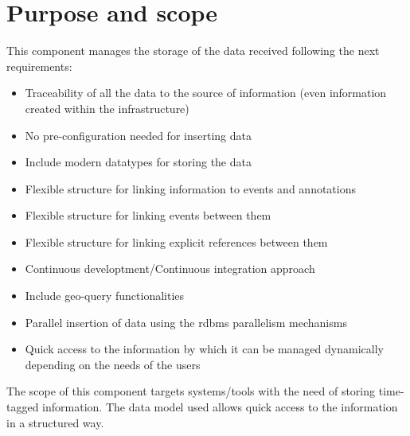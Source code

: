 \chapter{Purpose and scope}

This component manages the storage of the data received following the next requirements:

\begin{itemize} 

\item Traceability of all the data to the source of information (even information created within the infrastructure)

\item No pre-configuration needed for inserting data

\item Include modern datatypes for storing the data

\item Flexible structure for linking information to events and annotations

\item Flexible structure for linking events between them

\item Flexible structure for linking explicit references between them

\item Continuous developtment/Continuous integration approach

\item Include geo-query functionalities

\item Parallel insertion of data using the \acrshort{rdbms} parallelism mechanisms

\item Quick access to the information by which it can be managed dynamically depending on the needs of the users

\end{itemize}

The scope of this component targets systems/tools with the need of storing time-tagged information. The data model used allows quick access to the information in a structured way.
